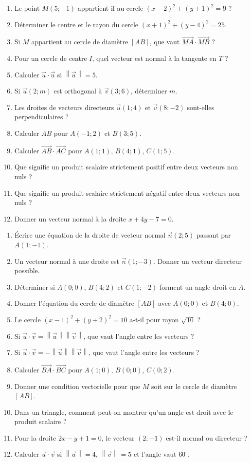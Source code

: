 \documentclass[11pt,a4paper]{article}
\newcommand{\norme}[1]{\left\lVert #1\right\rVert}
\newcounter{question}
\newenvironment{blocquestions}[1]{%
  \begin{tcolorbox}[enhanced,breakable,colback=bleuclair,colframe=bleufonce,boxrule=0.6pt,arc=2mm,left=2mm,right=2mm,top=2mm,bottom=1.5mm,title={\bfseries #1},coltitle=white,colbacktitle=bleufonce,before skip=3mm,after skip=3mm, fontupper=\large]
  \large
  \begin{enumerate}[leftmargin=*,label=\textbf{\arabic*.},itemsep=0.82em,topsep=0.5em]
  \setcounter{enumi}{\value{question}}
}{%
  \setcounter{question}{\value{enumi}}
  \end{enumerate}
  \end{tcolorbox}
}
\begin{document}
\begin{blocquestions}{Questions flash 13 à 24}
\item Le point $M(5;-1)$ appartient-il au cercle $(x-2)^2+(y+1)^2=9$ ?
\item Déterminer le centre et le rayon du cercle $(x+1)^2+(y-4)^2=25$.
\item Si $M$ appartient au cercle de diamètre $[AB]$, que vaut $\overrightarrow{MA}\cdot\overrightarrow{MB}$ ?
\item Pour un cercle de centre $I$, quel vecteur est normal à la tangente en $T$ ?
\item Calculer $\vec u\cdot\vec u$ si $\norme{\vec u}=5$.
\item Si $\vec u(2;m)$ est orthogonal à $\vec v(3;6)$, déterminer $m$.
\item Les droites de vecteurs directeurs $\vec u(1;4)$ et $\vec v(8;-2)$ sont-elles perpendiculaires ?
\item Calculer $AB$ pour $A(-1;2)$ et $B(3;5)$.
\item Calculer $\overrightarrow{AB}\cdot\overrightarrow{AC}$ pour $A(1;1)$, $B(4;1)$, $C(1;5)$.
\item Que signifie un produit scalaire strictement positif entre deux vecteurs non nuls ?
\item Que signifie un produit scalaire strictement négatif entre deux vecteurs non nuls ?
\item Donner un vecteur normal à la droite $x+4y-7=0$.
\end{blocquestions}
\begin{blocquestions}{Questions flash 25 à 36}
\item Écrire une équation de la droite de vecteur normal $\vec n(2;5)$ passant par $A(1;-1)$.
\item Un vecteur normal à une droite est $\vec n(1;-3)$. Donner un vecteur directeur possible.
\item Déterminer si $A(0;0)$, $B(4;2)$ et $C(1;-2)$ forment un angle droit en $A$.
\item Donner l’équation du cercle de diamètre $[AB]$ avec $A(0;0)$ et $B(4;0)$.
\item Le cercle $(x-1)^2+(y+2)^2=10$ a-t-il pour rayon $\sqrt{10}$ ?
\item Si $\vec u\cdot\vec v=\norme{\vec u}\norme{\vec v}$, que vaut l’angle entre les vecteurs ?
\item Si $\vec u\cdot\vec v=-\norme{\vec u}\norme{\vec v}$, que vaut l’angle entre les vecteurs ?
\item Calculer $\overrightarrow{BA}\cdot\overrightarrow{BC}$ pour $A(1;0)$, $B(0;0)$, $C(0;2)$.
\item Donner une condition vectorielle pour que $M$ soit sur le cercle de diamètre $[AB]$.
\item Dans un triangle, comment peut-on montrer qu’un angle est droit avec le produit scalaire ?
\item Pour la droite $2x-y+1=0$, le vecteur $(2;-1)$ est-il normal ou directeur ?
\item Calculer $\vec u\cdot\vec v$ si $\norme{\vec u}=4$, $\norme{\vec v}=5$ et l’angle vaut $60^\circ$.
\end{blocquestions}
\end{document}
